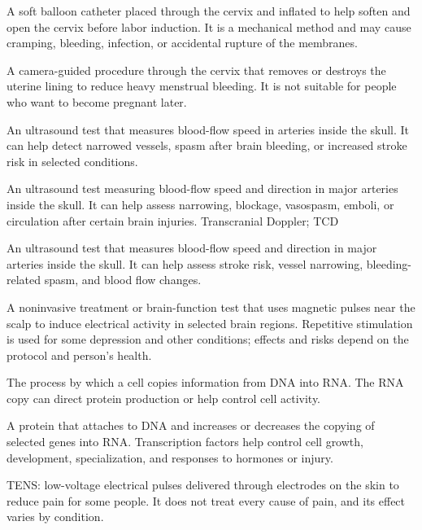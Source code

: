  A soft balloon catheter placed through the cervix and inflated to help soften and open the cervix before labor induction. It is a mechanical method and may cause cramping, bleeding, infection, or accidental rupture of the membranes.

 A camera-guided procedure through the cervix that removes or destroys the uterine lining to reduce heavy menstrual bleeding. It is not suitable for people who want to become pregnant later.

 An ultrasound test that measures blood-flow speed in arteries inside the skull. It can help detect narrowed vessels, spasm after brain bleeding, or increased stroke risk in selected conditions.

 An ultrasound test measuring blood-flow speed and direction in major arteries inside the skull. It can help assess narrowing, blockage, vasospasm, emboli, or circulation after certain brain injuries.
\synonyms
Transcranial Doppler; TCD

 An ultrasound test that measures blood-flow speed and direction in major arteries inside the skull. It can help assess stroke risk, vessel narrowing, bleeding-related spasm, and blood flow changes.

 A noninvasive treatment or brain-function test that uses magnetic pulses near the scalp to induce electrical activity in selected brain regions. Repetitive stimulation is used for some depression and other conditions; effects and risks depend on the protocol and person’s health.

 The process by which a cell copies information from DNA into RNA. The RNA copy can direct protein production or help control cell activity.

 A protein that attaches to DNA and increases or decreases the copying of selected genes into RNA. Transcription factors help control cell growth, development, specialization, and responses to hormones or injury.

 TENS: low-voltage electrical pulses delivered through electrodes on the skin to reduce pain for some people. It does not treat every cause of pain, and its effect varies by condition.

